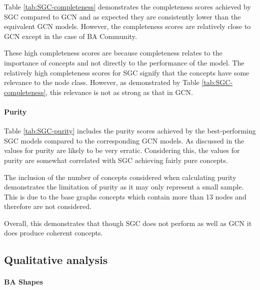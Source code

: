 Table \ref{tab:SGC-completeness} demonstrates the completeness scores achieved by SGC compared to GCN and as expected they are consistently lower than the equivalent GCN models.
However, the completeness scores are relatively close to GCN except in the case of BA Community.

These high completeness scores are because completeness relates to the importance of concepts and not directly to the performance of the model.
The relatively high completeness scores for SGC signify that the concepts have some relevance to the node class.
However, as demonstrated by Table \ref{tab:SGC-completeness}, this relevance is not as strong as that in GCN.

\paragraph{Purity}


Table \ref{tab:SGC-purity} includes the purity scores achieved by the best-performing SGC models compared to the corresponding GCN models.
As discussed in  the values for purity are likely to be very erratic.
Considering this, the values for purity are somewhat correlated with SGC achieving fairly pure concepts.

The inclusion of the number of concepts considered when calculating purity demonstrates the limitation of purity as it may only represent a small sample.
This is due to the base graphs concepts which contain more than 13 nodes and therefore are not considered.

Overall, this demonstrates that though SGC does not perform as well as GCN it does produce coherent concepts.

\subsection{Qualitative analysis}
\label{sec:concept-analysis}

\paragraph{BA Shapes}


